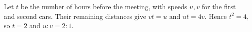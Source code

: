 Let $t$ be the number of hours before the meeting, with speeds $u,v$ for the first and second cars. Their remaining distances give $vt=u$ and $ut=4v$. Hence $t^2=4$, so $t=2$ and $\boxed{u:v=2:1}$.

